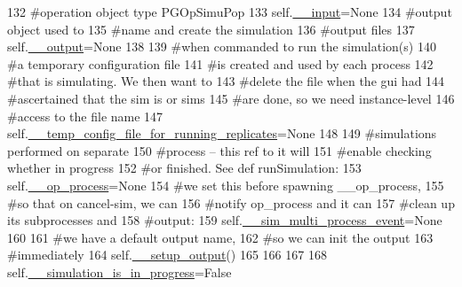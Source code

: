 \begin{DoxyCode}
132         \textcolor{comment}{#operation object type PGOpSimuPop}
133         self.\hyperlink{classnegui_1_1pgguisimupop_1_1PGGuiSimuPop_a0b9f7d933b428393d34105828600a007}{\_\_input}=\textcolor{keywordtype}{None}
134         \textcolor{comment}{#output object used to}
135         \textcolor{comment}{#name and create the simulation}
136         \textcolor{comment}{#output files}
137         self.\hyperlink{classnegui_1_1pgguisimupop_1_1PGGuiSimuPop_a30f6eabf78230001520f90cb36de339f}{\_\_output}=\textcolor{keywordtype}{None}
138 
139         \textcolor{comment}{#when commanded to run the simulation(s)}
140         \textcolor{comment}{#a temporary configuration file}
141         \textcolor{comment}{#is created and used by each process}
142         \textcolor{comment}{#that is simulating.  We then want to}
143         \textcolor{comment}{#delete the file when the gui had }
144         \textcolor{comment}{#ascertained that the sim is or sims}
145         \textcolor{comment}{#are done, so we need instance-level}
146         \textcolor{comment}{#access to the file name}
147         self.\hyperlink{classnegui_1_1pgguisimupop_1_1PGGuiSimuPop_a60c4be477f462c6981a08c479c20a893}{\_\_temp\_config\_file\_for\_running\_replicates}=\textcolor{keywordtype}{None}
148 
149         \textcolor{comment}{#simulations performed on separate}
150         \textcolor{comment}{#process -- this ref to it will}
151         \textcolor{comment}{#enable checking whether in progress}
152         \textcolor{comment}{#or finished.  See def runSimulation:}
153         self.\hyperlink{classnegui_1_1pgguisimupop_1_1PGGuiSimuPop_acdcfde3516741c64806c6881f65c6f4e}{\_\_op\_process}=\textcolor{keywordtype}{None}
154         \textcolor{comment}{#we set this before spawning \_\_op\_process,}
155         \textcolor{comment}{#so that on cancel-sim, we can}
156         \textcolor{comment}{#notify op\_process and it can }
157         \textcolor{comment}{#clean up its subprocesses and }
158         \textcolor{comment}{#output:}
159         self.\hyperlink{classnegui_1_1pgguisimupop_1_1PGGuiSimuPop_a02ccc7da9aec67e8e13e083001aba15b}{\_\_sim\_multi\_process\_event}=\textcolor{keywordtype}{None}
160 
161         \textcolor{comment}{#we have a default output name,}
162         \textcolor{comment}{#so we can init the output}
163         \textcolor{comment}{#immediately}
164         self.\hyperlink{classnegui_1_1pgguisimupop_1_1PGGuiSimuPop_a23913431472d154054d66ab5e72daf0e}{\_\_setup\_output}()
165 
166 
167 
168         self.\hyperlink{classnegui_1_1pgguisimupop_1_1PGGuiSimuPop_a5064bac64c69bd13fe1366b21f1f7ad9}{\_\_simulation\_is\_in\_progress}=\textcolor{keyword}{False}

\end{DoxyCode}
